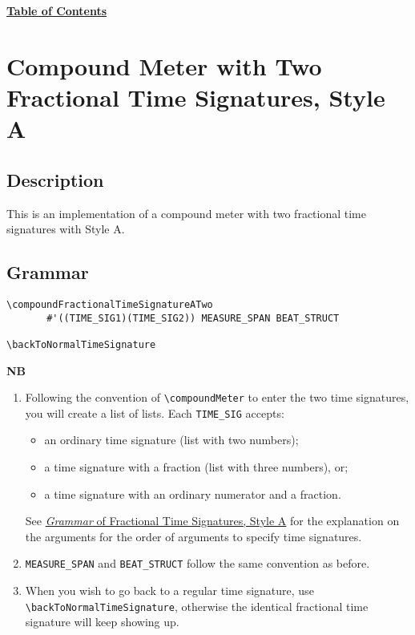 \hyperref[sec:toc]{\textbf{Table of Contents}}

\vfill \break




\section {Compound Meter with Two Fractional Time Signatures, Style A}

\hfill
{}
\hfill

\subsection{Description}
This is an implementation of a compound meter with two fractional time signatures with Style A.  

\subsection{Grammar}
\begin{verbatim}
\compoundFractionalTimeSignatureATwo
       #'((TIME_SIG1)(TIME_SIG2)) MEASURE_SPAN BEAT_STRUCT

\backToNormalTimeSignature

\end{verbatim}
\textbf{NB} 
\begin{enumerate}
\item Following the convention of \verb|\compoundMeter| to enter the two time signatures, you will create a list of lists. Each \verb|TIME_SIG| accepts:\par
\begin{itemize} 
\item an ordinary time signature (list with two numbers); 
\item a time signature with a fraction (list with three numbers), or;
\item a time signature with an ordinary numerator and a fraction.
\end{itemize} 
See \hyperref[sec:time_signatures_styleA_convention]{\textit{Grammar} of Fractional Time Signatures, Style A} for the explanation on the arguments for the order of arguments to specify time signatures.
\item \verb|MEASURE_SPAN| and \verb|BEAT_STRUCT| follow the same convention as before.
\item When you wish to go back to a regular time signature, use \verb|\backToNormalTimeSignature|, otherwise the identical fractional time signature will keep showing up.
\end{enumerate}
